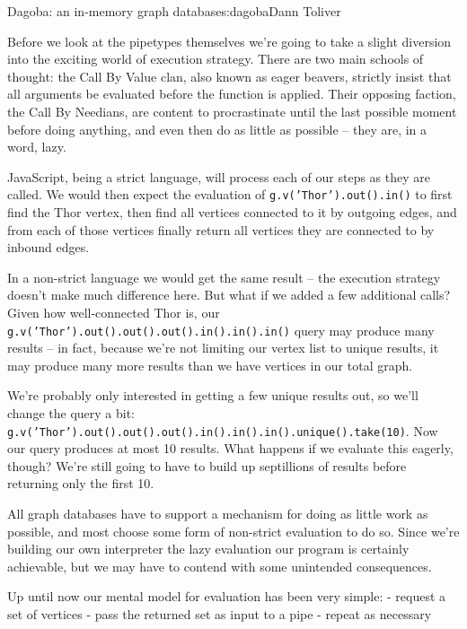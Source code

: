 \begin{aosachapter}{Dagoba: an in-memory graph database}{s:dagoba}{Dann Toliver}
\label{the-problem-with-being-eager}

Before we look at the pipetypes themselves we're going to take a slight
diversion into the exciting world of execution strategy. There are two
main schools of thought: the Call By Value clan, also known as eager
beavers, strictly insist that all arguments be evaluated before the
function is applied. Their opposing faction, the Call By Needians, are
content to procrastinate until the last possible moment before doing
anything, and even then do as little as possible -- they are, in a word,
lazy.

JavaScript, being a strict language, will process each of our steps as
they are called. We would then expect the evaluation of
\texttt{g.v('Thor').out().in()} to first find the Thor vertex, then find
all vertices connected to it by outgoing edges, and from each of those
vertices finally return all vertices they are connected to by inbound
edges.

In a non-strict language we would get the same result -- the execution
strategy doesn't make much difference here. But what if we added a few
additional calls? Given how well-connected Thor is, our
\texttt{g.v('Thor').out().out().out().in().in().in()} query may produce
many results -- in fact, because we're not limiting our vertex list to
unique results, it may produce many more results than we have vertices
in our total graph.

We're probably only interested in getting a few unique results out, so
we'll change the query a bit:
\texttt{g.v('Thor').out().out().out().in().in().in().unique().take(10)}.
Now our query produces at most 10 results. What happens if we evaluate
this eagerly, though? We're still going to have to build up septillions
of results before returning only the first 10.

All graph databases have to support a mechanism for doing as little work
as possible, and most choose some form of non-strict evaluation to do
so. Since we're building our own interpreter the lazy evaluation our
program is certainly achievable, but we may have to contend with some
unintended consequences.

\label{ramifications-of-evaluation-strategy-on-our-mental-model}

Up until now our mental model for evaluation has been very simple: -
request a set of vertices - pass the returned set as input to a pipe -
repeat as necessary


\end{aosachapter}
